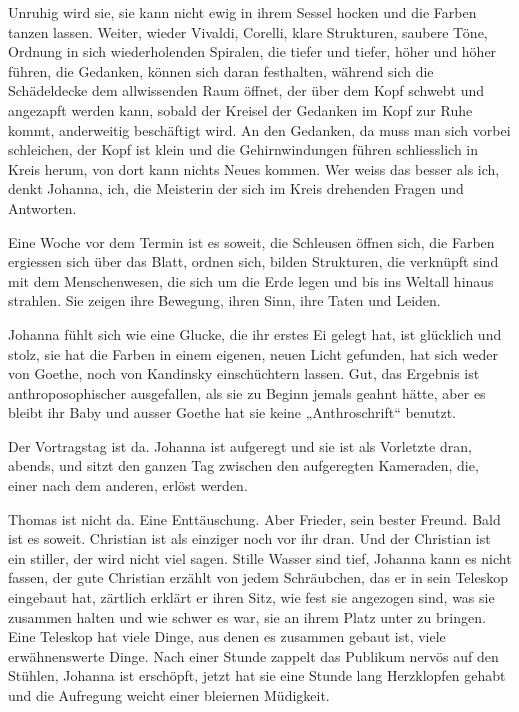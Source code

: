 \documentclass[10pt,a5paper]{book}
\begin{document}
Unruhig wird sie, sie kann nicht ewig in ihrem Sessel hocken und die Farben tanzen lassen. Weiter, wieder Vivaldi, Corelli, klare Strukturen, saubere Töne, Ordnung in sich wiederholenden Spiralen, die tiefer und tiefer, höher und höher führen, die Gedanken, können sich daran festhalten, während sich die Schädeldecke dem allwissenden Raum öffnet, der über dem Kopf schwebt und angezapft werden kann, sobald der Kreisel der Gedanken im Kopf zur Ruhe kommt, anderweitig beschäftigt wird. An den Gedanken, da muss man sich vorbei schleichen, der Kopf ist klein und die Gehirnwindungen führen schliesslich in Kreis herum, von dort kann nichts Neues kommen. Wer weiss das besser als ich, denkt Johanna, ich, die Meisterin der sich im Kreis drehenden Fragen und Antworten.

Eine Woche vor dem Termin ist es soweit, die Schleusen öffnen sich, die Farben ergiessen sich über das Blatt, ordnen sich, bilden Strukturen, die verknüpft sind mit dem Menschenwesen, die sich um die Erde legen und bis ins Weltall hinaus strahlen. Sie zeigen ihre Bewegung, ihren Sinn, ihre Taten und Leiden.

Johanna fühlt sich wie eine Glucke, die ihr erstes Ei gelegt hat, ist glücklich und stolz, sie hat die Farben in einem eigenen, neuen Licht gefunden, hat sich weder von Goethe, noch von Kandinsky einschüchtern lassen. Gut, das Ergebnis ist anthroposophischer ausgefallen, als sie zu Beginn jemals geahnt hätte, aber es bleibt ihr Baby und ausser Goethe hat sie keine „Anthroschrift“ benutzt.

Der Vortragstag ist da. Johanna ist aufgeregt und sie ist als Vorletzte dran, abends, und sitzt den ganzen Tag zwischen den aufgeregten Kameraden, die, einer nach dem anderen, erlöst werden.

Thomas ist nicht da. Eine Enttäuschung. Aber Frieder, sein bester Freund.
Bald ist es soweit. Christian ist als einziger noch vor ihr dran. Und der Christian ist ein stiller, der wird nicht viel sagen. Stille Wasser sind tief, Johanna kann es nicht fassen, der gute Christian erzählt von jedem Schräubchen, das er in sein Teleskop eingebaut hat, zärtlich erklärt er ihren Sitz, wie fest sie angezogen sind, was sie zusammen halten und wie schwer es war, sie an ihrem Platz unter zu bringen. Eine Teleskop hat viele Dinge, aus denen es zusammen gebaut ist, viele erwähnenswerte Dinge. Nach einer Stunde zappelt das Publikum nervös auf den Stühlen, Johanna ist erschöpft, jetzt hat sie eine Stunde lang Herzklopfen gehabt und die Aufregung weicht einer bleiernen Müdigkeit. 
\end{document}
